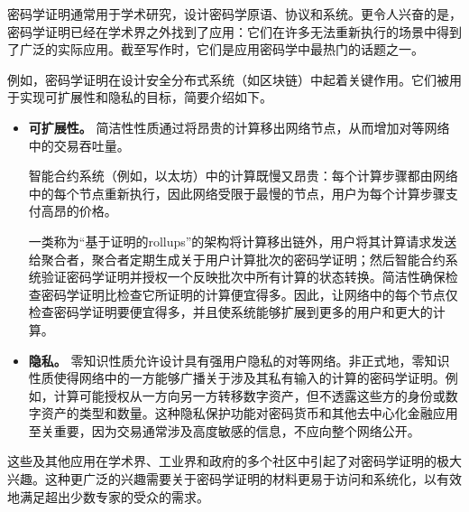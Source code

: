 \documentclass[american,singlepageview]{snargs-book-zh}
\begin{document}
密码学证明通常用于学术研究，设计密码学原语、协议和系统。更令人兴奋的是，密码学证明已经在学术界之外找到了应用：它们在许多无法重新执行的场景中得到了广泛的实际应用。截至写作时，它们是应用密码学中最热门的话题之一。

例如，密码学证明在设计安全分布式系统（如区块链）中起着关键作用。它们被用于实现可扩展性和隐私的目标，简要介绍如下。
\begin{itemize}

  \item \textbf{可扩展性。}
  简洁性性质通过将昂贵的计算移出网络节点，从而增加对等网络中的交易吞吐量。

  智能合约系统（例如，以太坊）中的计算既慢又昂贵：每个计算步骤都由网络中的每个节点重新执行，因此网络受限于最慢的节点，用户为每个计算步骤支付高昂的价格。

  一类称为“基于证明的rollups”的架构将计算移出链外，用户将其计算请求发送给聚合者，聚合者定期生成关于用户计算批次的密码学证明；然后智能合约系统验证密码学证明并授权一个反映批次中所有计算的状态转换。简洁性确保检查密码学证明比检查它所证明的计算便宜得多。因此，让网络中的每个节点仅检查密码学证明要便宜得多，并且使系统能够扩展到更多的用户和更大的计算。

  \item \textbf{隐私。}
  零知识性质允许设计具有强用户隐私的对等网络。非正式地，零知识性质使得网络中的一方能够广播关于涉及其私有输入的计算的密码学证明。例如，计算可能授权从一方向另一方转移数字资产，但不透露这些方的身份或数字资产的类型和数量。这种隐私保护功能对密码货币和其他去中心化金融应用至关重要，因为交易通常涉及高度敏感的信息，不应向整个网络公开。

\end{itemize}
这些及其他应用在学术界、工业界和政府的多个社区中引起了对密码学证明的极大兴趣。这种更广泛的兴趣需要关于密码学证明的材料更易于访问和系统化，以有效地满足超出少数专家的受众的需求。

\cleardoublepage
\printbibliography
\end{document}
